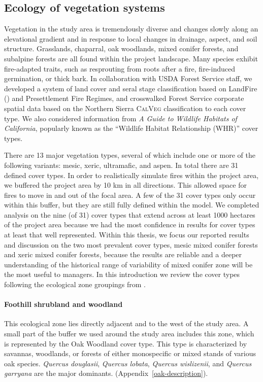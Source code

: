 \subsection{Ecology of vegetation systems}
Vegetation in the study area is tremendously diverse and changes slowly along an elevational gradient and in response to local changes in drainage, aspect, and soil structure. Grasslands, chaparral, oak woodlands, mixed conifer forests, and subalpine forests are all found within the project landscape. Many species exhibit fire-adapted traits, such as resprouting from roots after a fire, fire-induced germination, or thick bark. In collaboration with USDA Forest Service staff, we developed a system of land cover and seral stage classification based on LandFire (\mbox{}) and \citet[]['s]{VandeWater2011}  Presettlement Fire Regimes, and crosswalked Forest Service corporate spatial data based on the Northern Sierra \textsc{CalVeg} classification to each cover type. We also considered information from \emph{A Guide to Wildlife Habitats of California}, popularly known as the ``Wildlife Habitat Relationship (WHR)'' cover types. 

There are 13 major vegetation types, several of which include one or more of the following variants: mesic, xeric, ultramafic, and aspen. In total there are 31 defined cover types. In order to realistically simulate fires within the project area, we buffered the project area by 10 km in all directions. This allowed space for fires to move in and out of the focal area. A few of the 31 cover types only occur within this buffer, but they are still fully defined within the model. We completed analysis on the nine (of 31) cover types that extend across at least 1000 hectares of the project area because we had the most confidence in results for cover types at least that well represented. Within this thesis, we focus our reported results and discussion on the two most prevalent cover types, mesic mixed conifer forests and xeric mixed conifer forests, because the results are reliable and a deeper understanding of the historical range of variability of mixed conifer zone will be the most useful to managers. In this introduction we review the cover types following the ecological zone groupings from \citet{VanWag2006}. 

\paragraph{Foothill shrubland and woodland} This ecological zone lies directly adjacent and to the west of the study area. A small part of the buffer we used around the study area includes this zone, which is represented by the Oak Woodland cover type. This type is characterized by savannas, woodlands, or forests of either monospecific or mixed stands of various oak species. \emph{Quercus douglasii}, \emph{Quercus lobata}, \emph{Quercus wislizenii}, and \emph{Quercus garryana} are the major dominants. (Appendix~\ref{oak-description}). 

